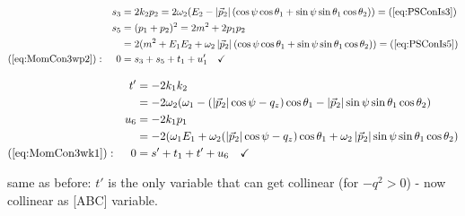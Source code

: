 \begin{align}
&&s_3 &= 2k_2p_2 = 2\omega_2(E_2-\left|\vec p_2\right|(\cos\psi\cos\theta_1+\sin\psi\sin\theta_1\cos\theta_2)) = (\ref{eq:PSConIs3})\\
&&s_5 &= (p_1+p_2)^2 = 2m^2+2p_1p_2\\
&& &= 2(m^2+E_1E_2+\omega_2\left|\vec p_2\right|(\cos\psi\cos\theta_1+\sin\psi\sin\theta_1\cos\theta_2)) = (\ref{eq:PSConIs5})\\
(\ref{eq:MomCon3wp2}): &&0 &= s_3+s_5+t_1+u_1'\quad\checkmark
\end{align}

\begin{align}
&&t' &= -2k_1k_2\\
 &&&= -2\omega_2(\omega_1 - (\left|\vec p_2\right|\cos\psi-q_z)\cos\theta_1 - \left|\vec p_2\right|\sin\psi\sin\theta_1\cos\theta_2)\\
&&u_6 &= - 2k_1p_1\\
 &&&= -2(\omega_1 E_1 + \omega_2(\left|\vec p_2\right|\cos\psi-q_z)\cos\theta_1 + \omega_2\left|\vec p_2\right|\sin\psi\sin\theta_1\cos\theta_2)\\
(\ref{eq:MomCon3wk1}): &&0 &= s'+t_1+t'+u_6\quad\checkmark
\end{align}

same as before: $t'$ is the only variable that can get collinear (for $-q^2 > 0$) - now collinear as [ABC] variable.
